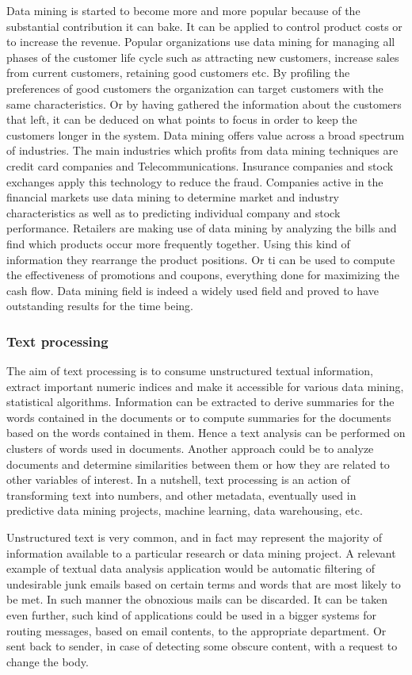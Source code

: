 Data mining is started to become more and more popular because of the substantial contribution it can bake. It can be applied to control product costs or to increase the revenue. Popular organizations use data mining for managing all phases of the customer life cycle such as attracting new customers, increase sales from current customers, retaining good customers etc.
By profiling the preferences of good customers the organization can target customers with the same characteristics. Or by having gathered the information about the customers that left, it can be deduced on what points to focus in order to keep the customers longer in the system. Data mining offers value across a broad spectrum of industries. The main industries which profits from data mining techniques are credit card companies and Telecommunications. Insurance companies and stock exchanges apply this technology to reduce the fraud. Companies active in the financial markets use data mining to determine market and industry characteristics as well as to predicting individual company and stock performance. Retailers are making use of data mining by analyzing the bills and find which products occur more frequently together. Using this kind of information they rearrange the product positions. Or ti can be used to compute the effectiveness of promotions and coupons, everything done for maximizing the cash flow. Data mining field is indeed a widely used field and proved to have outstanding results for the time being.

\subsubsection{Text processing}
The aim of text processing is to consume unstructured textual information, extract important numeric indices and make it accessible for various data mining, statistical algorithms. Information can be extracted to derive summaries for the words contained in the documents or to compute summaries for the documents based on the words contained in them. Hence a text analysis can be performed on clusters of words used in documents. Another approach could be to analyze documents and determine similarities between them or how they are related to other variables of interest. In a nutshell, text processing is an action of transforming text into numbers, and other metadata, eventually used in predictive data mining projects, machine learning, data warehousing, etc.

Unstructured text is very common, and in fact may represent the majority of information available to a particular research or data mining project. A relevant example of textual data analysis application would be automatic filtering of undesirable junk emails based on certain terms and words that are most likely to be met. In such manner the obnoxious mails can be discarded. It can be taken even further, such kind of applications could be used in a bigger systems for routing messages, based on email contents, to the appropriate department. Or sent back to sender, in case of detecting some obscure content, with a request to change the body.

